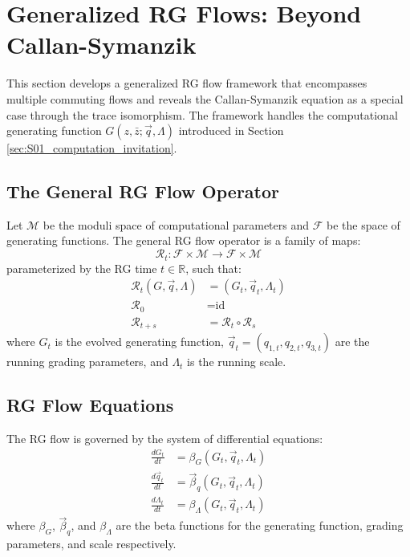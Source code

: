 
\section{Generalized RG Flows: Beyond Callan-Symanzik}
\label{sec:generalized-rg-flows}

This section develops a generalized RG flow framework that encompasses multiple commuting flows and reveals the Callan-Symanzik equation as a special case through the trace isomorphism. The framework handles the computational generating function $G(z, \bar{z}; \vec{q}, \Lambda)$ introduced in Section \ref{sec:S01_computation_invitation}.

\subsection{The General RG Flow Operator}

\begin{definition}
\label{def:general-rg-operator}
Let $\mathcal{M}$ be the moduli space of computational parameters and $\mathcal{F}$ be the space of generating functions. The general RG flow operator is a family of maps:
\[
\mathcal{R}_t: \mathcal{F} \times \mathcal{M} \to \mathcal{F} \times \mathcal{M}
\]
parameterized by the RG time $t \in \mathbb{R}$, such that:
\begin{align}
\mathcal{R}_t(G, \vec{q}, \Lambda) &= (G_t, \vec{q}_t, \Lambda_t) \\
\mathcal{R}_0 &= \text{id} \\
\mathcal{R}_{t+s} &= \mathcal{R}_t \circ \mathcal{R}_s
\end{align}
where $G_t$ is the evolved generating function, $\vec{q}_t = (q_{1,t}, q_{2,t}, q_{3,t})$ are the running grading parameters, and $\Lambda_t$ is the running scale.
\end{definition}

\subsection{RG Flow Equations}

\begin{definition}
\label{def:rg-flow-equations}
The RG flow is governed by the system of differential equations:
\begin{align}
\frac{dG_t}{dt} &= \beta_G(G_t, \vec{q}_t, \Lambda_t) \\
\frac{d\vec{q}_t}{dt} &= \vec{\beta}_q(G_t, \vec{q}_t, \Lambda_t) \\
\frac{d\Lambda_t}{dt} &= \beta_\Lambda(G_t, \vec{q}_t, \Lambda_t)
\end{align}
where $\beta_G$, $\vec{\beta}_q$, and $\beta_\Lambda$ are the beta functions for the generating function, grading parameters, and scale respectively.
\end{definition}

